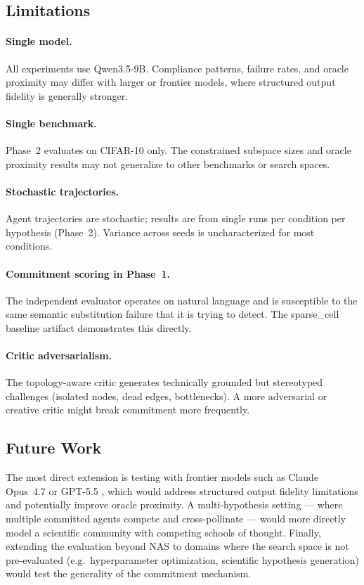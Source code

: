 \subsection{Limitations}
\label{sec:limitations}

\paragraph{Single model.} All experiments use Qwen3.5-9B. Compliance patterns,
failure rates, and oracle proximity may differ with larger or frontier models,
where structured output fidelity is generally stronger.

\paragraph{Single benchmark.} Phase~2 evaluates on \nasbench{} CIFAR-10 only.
The constrained subspace sizes and oracle proximity results may not generalize
to other benchmarks or search spaces.

\paragraph{Stochastic trajectories.} Agent trajectories are stochastic; results
are from single runs per condition per hypothesis (Phase~2). Variance across
seeds is uncharacterized for most conditions.

\paragraph{Commitment scoring in Phase~1.} The independent evaluator operates
on natural language and is susceptible to the same semantic substitution
failure that it is trying to detect. The sparse\_cell baseline artifact
demonstrates this directly.

\paragraph{Critic adversarialism.} The topology-aware critic generates
technically grounded but stereotyped challenges (isolated nodes, dead edges,
bottlenecks). A more adversarial or creative critic might break \haas{}
commitment more frequently.

\subsection{Future Work}

The most direct extension is testing \haas{} with frontier models such as
Claude Opus~4.7 \citep{anthropic2026opus47} or GPT-5.5 \citep{openai2026gpt55},
which would address structured output fidelity limitations and potentially
improve oracle proximity. A multi-hypothesis setting ---
where multiple committed agents compete and cross-pollinate --- would more directly
model a scientific community with competing schools of thought. Finally, extending
the evaluation beyond NAS to domains where the search space is not pre-evaluated
(e.g.\ hyperparameter optimization, scientific hypothesis generation) would test
the generality of the commitment mechanism.

